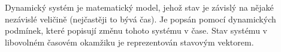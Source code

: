 \documentclass[thesis=B, czech]{FITthesis}[2019/03/06]
\let\oldquote\quote
\let\endoldquote\endquote
\renewenvironment{quote}[2][]
  {\if\relax\detokenize{#1}\relax
     \def\quoteauthor{#2}%
   \else
     \def\quoteauthor{#2~---~#1}%
   \fi
   \oldquote}
  {\par\nobreak\smallskip\hfill(\quoteauthor)%
   \endoldquote\addvspace{\bigskipamount}}
\begin{document}






Dynamický systém je matematický model, jehož stav je závislý na nějaké nezávislé veličině (nejčastěji to bývá čas). Je popsán pomocí dynamických podmínek, které popisují změnu tohoto systému v čase. Stav systému v libovolném časovém okamžiku je reprezentován stavovým vektorem.
\end{document}
